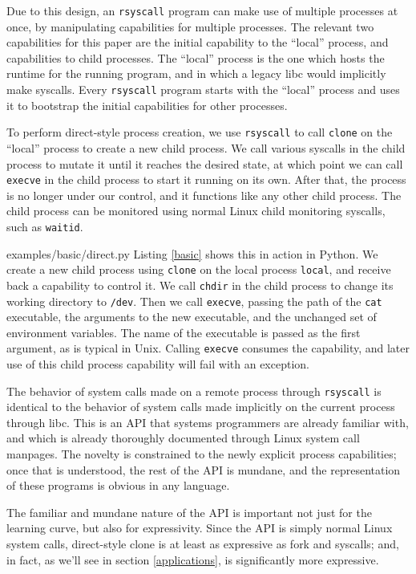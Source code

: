 \documentclass[sigplan]{acmart}
\begin{document}
Due to this design, an \texttt{rsyscall} program can make use of multiple processes at once,
by manipulating capabilities for multiple processes.
The relevant two capabilities for this paper are the initial capability to the ``local'' process,
and capabilities to child processes.
The ``local'' process is the one which hosts the runtime for the running program,
and in which a legacy libc would implicitly make syscalls.
Every \texttt{rsyscall} program starts with the ``local'' process
and uses it to bootstrap the initial capabilities for other processes.

To perform direct-style process creation,
we use \texttt{rsyscall} to call \texttt{clone} on the ``local'' process to create a new child process.
We call various syscalls in the child process to mutate it until it reaches the desired state,
at which point we can call \texttt{execve} in the child process to start it running on its own.
After that, the process is no longer under our control, and it functions like any other child process.
The child process can be monitored using normal Linux child monitoring syscalls,
such as \texttt{waitid}.


{examples/basic/direct.py}
Listing \ref{basic} shows this in action in Python.
We create a new child process using \texttt{clone} on the local process \verb|local|,
and receive back a capability to control it.
We call \texttt{chdir} in the child process to change its working directory to \texttt{/dev}.
Then we call \texttt{execve},
passing the path of the \texttt{cat} executable,
the arguments to the new executable,
and the unchanged set of environment variables.
The name of the executable is passed as the first argument,
as is typical in Unix.
Calling \texttt{execve} consumes the capability,
and later use of this child process capability will fail with an exception.

The behavior of system calls made on a remote process through \texttt{rsyscall}
is identical to the behavior of system calls made implicitly on the current process through libc.
This is an API that systems programmers are already familiar with,
and which is already thoroughly documented through Linux system call manpages.
The novelty is constrained to the newly explicit process capabilities;
once that is understood, the rest of the API is mundane,
and the representation of these programs is obvious in any language.

The familiar and mundane nature of the API is important not just for the learning curve,
but also for expressivity.
Since the API is simply normal Linux system calls,
direct-style clone is at least as expressive as fork and syscalls;
and, in fact, as we'll see in section \ref{applications},
is significantly more expressive.
\end{document}
